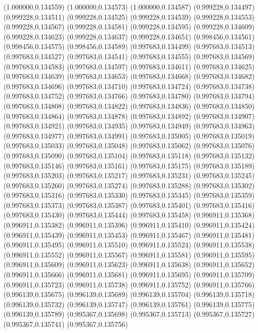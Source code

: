(1.000000,0.134559)
(1.000000,0.134573)
(1.000000,0.134587)
(0.999228,0.134497)
(0.999228,0.134511)
(0.999228,0.134525)
(0.999228,0.134539)
(0.999228,0.134553)
(0.999228,0.134567)
(0.999228,0.134581)
(0.999228,0.134595)
(0.999228,0.134609)
(0.999228,0.134623)
(0.999228,0.134637)
(0.999228,0.134651)
(0.998456,0.134561)
(0.998456,0.134575)
(0.998456,0.134589)
(0.997683,0.134499)
(0.997683,0.134513)
(0.997683,0.134527)
(0.997683,0.134541)
(0.997683,0.134555)
(0.997683,0.134569)
(0.997683,0.134583)
(0.997683,0.134597)
(0.997683,0.134611)
(0.997683,0.134625)
(0.997683,0.134639)
(0.997683,0.134653)
(0.997683,0.134668)
(0.997683,0.134682)
(0.997683,0.134696)
(0.997683,0.134710)
(0.997683,0.134724)
(0.997683,0.134738)
(0.997683,0.134752)
(0.997683,0.134766)
(0.997683,0.134780)
(0.997683,0.134794)
(0.997683,0.134808)
(0.997683,0.134822)
(0.997683,0.134836)
(0.997683,0.134850)
(0.997683,0.134864)
(0.997683,0.134878)
(0.997683,0.134892)
(0.997683,0.134907)
(0.997683,0.134921)
(0.997683,0.134935)
(0.997683,0.134949)
(0.997683,0.134963)
(0.997683,0.134977)
(0.997683,0.134991)
(0.997683,0.135005)
(0.997683,0.135019)
(0.997683,0.135033)
(0.997683,0.135048)
(0.997683,0.135062)
(0.997683,0.135076)
(0.997683,0.135090)
(0.997683,0.135104)
(0.997683,0.135118)
(0.997683,0.135132)
(0.997683,0.135146)
(0.997683,0.135161)
(0.997683,0.135175)
(0.997683,0.135189)
(0.997683,0.135203)
(0.997683,0.135217)
(0.997683,0.135231)
(0.997683,0.135245)
(0.997683,0.135260)
(0.997683,0.135274)
(0.997683,0.135288)
(0.997683,0.135302)
(0.997683,0.135316)
(0.997683,0.135330)
(0.997683,0.135345)
(0.997683,0.135359)
(0.997683,0.135373)
(0.997683,0.135387)
(0.997683,0.135401)
(0.997683,0.135416)
(0.997683,0.135430)
(0.997683,0.135444)
(0.997683,0.135458)
(0.996911,0.135368)
(0.996911,0.135382)
(0.996911,0.135396)
(0.996911,0.135410)
(0.996911,0.135424)
(0.996911,0.135439)
(0.996911,0.135453)
(0.996911,0.135467)
(0.996911,0.135481)
(0.996911,0.135495)
(0.996911,0.135510)
(0.996911,0.135524)
(0.996911,0.135538)
(0.996911,0.135552)
(0.996911,0.135567)
(0.996911,0.135581)
(0.996911,0.135595)
(0.996911,0.135609)
(0.996911,0.135623)
(0.996911,0.135638)
(0.996911,0.135652)
(0.996911,0.135666)
(0.996911,0.135681)
(0.996911,0.135695)
(0.996911,0.135709)
(0.996911,0.135723)
(0.996911,0.135738)
(0.996911,0.135752)
(0.996911,0.135766)
(0.996139,0.135675)
(0.996139,0.135689)
(0.996139,0.135704)
(0.996139,0.135718)
(0.996139,0.135732)
(0.996139,0.135747)
(0.996139,0.135761)
(0.996139,0.135775)
(0.996139,0.135789)
(0.995367,0.135698)
(0.995367,0.135713)
(0.995367,0.135727)
(0.995367,0.135741)
(0.995367,0.135756)

